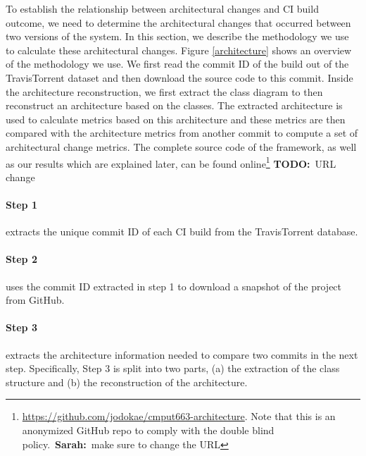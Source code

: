 \documentclass[sigplan, anonymous, review]{acmart}
\newcommand{\sn}[1]{{\color{blue}\textbf{Sarah:}~#1}}
\newcommand{\todo}[1]{{ \color{red} \textbf{TODO:}~#1}}
\begin{document}
To establish the relationship between architectural changes and CI build outcome, we need to determine the architectural changes that occurred between two versions of the system.
In this section, we describe the methodology we use to calculate these architectural changes.
Figure \ref{architecture} shows an overview of the methodology we use.
We first read the commit ID of the build out of the TravisTorrent dataset and then download the source code to this commit. Inside the architecture reconstruction, we first extract the class diagram to then reconstruct an architecture based on the classes. 
The extracted architecture is used to calculate metrics based on this architecture and these metrics are then compared with the architecture metrics from another commit to compute a set of architectural change metrics.
The complete source code of the framework, as well as our results which are explained later, can be found online\footnote{\url{https://github.com/jodokae/cmput663-architecture}. Note that this is an anonymized GitHub repo to comply with the double blind policy.~\sn{make sure to change the URL}} \todo{URL change}
 
\paragraph{Step 1} extracts the unique commit ID of each CI build from the TravisTorrent database.

\paragraph{Step 2} uses the commit ID extracted in step 1 to download a snapshot of the project from GitHub.


\paragraph{Step 3} extracts the architecture information needed to compare two commits in the next step. 
Specifically, Step 3 is split into two parts, (a) the extraction of the class structure and (b) the reconstruction of the architecture. 
\end{document}
